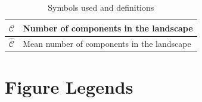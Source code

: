 \documentclass[12pt]{article}
\begin{document}
\begin{table}[h]
\begin{tabular}{  p{5cm}  |  p{10cm} }
  $\mathcal{C}$ & Number of components in the landscape \\ \hline
  $\hat{\mathcal{C}}$ & Mean number of components in the landscape  \\ \hline
\end{tabular}
\caption{Symbols used and definitions}
\label{table2}
\end{table}

\vspace{5 in}
\newpage

\section*{Figure Legends}
\end{document}
